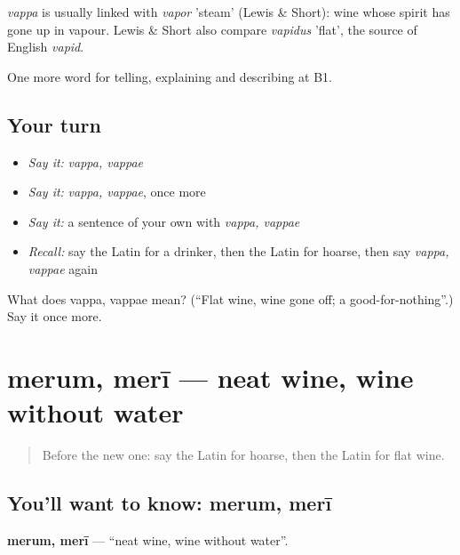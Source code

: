 \begin{cousinweb}
\emph{vappa} is usually linked with \emph{vapor} 'steam' (Lewis \& Short): wine whose spirit has gone up in vapour. Lewis \& Short also compare \emph{vapidus} 'flat', the source of English \emph{vapid}.
\end{cousinweb}

\begin{grammarlens}[title={What you've built}]
One more word for telling, explaining and describing at B1.
\end{grammarlens}

\subsection*{Your turn}
\begin{itemize}
\raggedright
  \item \emph{Say it:} \emph{vappa, vappae}
  \item \emph{Say it:} \emph{vappa, vappae}, once more
  \item \emph{Say it:} a sentence of your own with \emph{vappa, vappae}
  \item \emph{Recall:} say the Latin for a drinker, then the Latin for hoarse, then say \emph{vappa, vappae} again
\end{itemize}

\begin{tcolorbox}[breakable,colback=teal!4,colframe=teal!35!black,title={Before you move on}]
What does vappa, vappae mean? (\textquotedblleft{}Flat wine, wine gone off; a good-for-nothing\textquotedblright{}.) Say it once more.
\end{tcolorbox}
\section[merum, merī]{merum, merī — neat wine, wine without water}

\label{lesson:LA-C449-merum}



\begin{quote}
Before the new one: say the Latin for hoarse, then the Latin for flat wine.
\end{quote}

\subsection*{You'll want to know: merum, merī}
\textbf{merum, merī} — \textquotedblleft{}neat wine, wine without water\textquotedblright{}.

